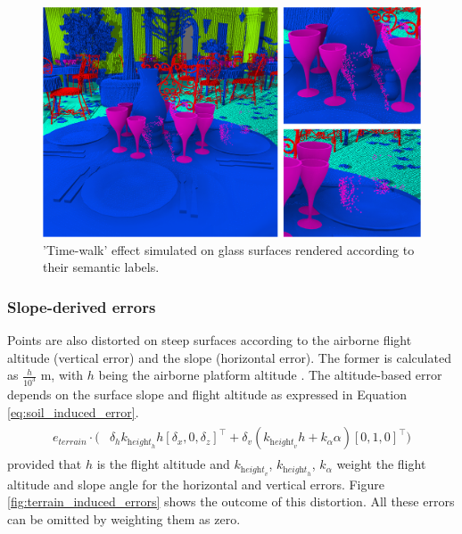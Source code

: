 \begin{figure}
	\centering
	\includegraphics[width=.8\linewidth]{figs/lidar_simulation/glossy_time_walk.png}
	\caption{'Time-walk' effect simulated on glass surfaces rendered according to their semantic labels. }
	\label{fig:shiny_surface_error}
\end{figure}

\subsubsection{Slope-derived errors}

Points are also distorted on steep surfaces according to the airborne flight altitude (vertical error) and the slope (horizontal error). The former is calculated as $\frac{h}{10^3}$ \si{\meter}, with $h$ being the airborne platform altitude \cite{hodgson_accuracy_2004}. The altitude-based error depends on the surface slope and flight altitude \cite{baltsavias_comparison_1999} as expressed in Equation \ref{eq:soil_induced_error}.
\begin{gather}
    \label{eq:soil_induced_error}
    \begin{aligned}
        e_{\textit{terrain}} \cdot (&\delta_{h} k_{\textit{height}_{h}} h 
        \left[\delta_{x}, 0, \delta_{z}\right]^\intercal + \delta_{v} (k_{\textit{height}_{v}} h + k_{\alpha} \alpha)
        \left[0, 1, 0\right]^\intercal)
    \end{aligned}
\end{gather}
provided that $h$ is the flight altitude and $k_{\textit{height}_{v}}$, $k_{\textit{height}_{h}}$,  $k_{\alpha}$ weight the flight altitude and slope angle for the horizontal and vertical errors. Figure \ref{fig:terrain_induced_errors} shows the outcome of this distortion. All these errors can be omitted by weighting them as zero.

